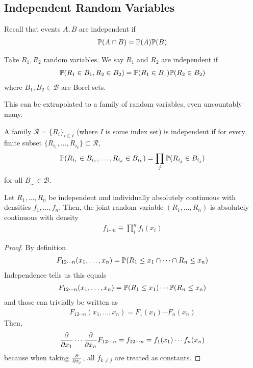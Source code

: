 \subsection{Independent Random Variables}
Recall that events $A,B$ are independent if
\begin{align}
    \mathbb{P}(A \cap B) = \mathbb{P}(A) \mathbb{P}(B)
\end{align}
\begin{definition}
    Take $R_1,R_2$ random variables. We say $R_1$ and $R_2$ are independent if
    \begin{align}
        \mathbb{P}(R_1 \in B_1, R_2 \in B_2) = \mathbb{P}(R_1 \in B_1) \mathbb{P}(R_2 \in B_2)
    \end{align}
    where $B_1, B_2 \in \mathcal{B}$ are Borel sets.
\end{definition}
\noindent This can be extrapolated to a family of random variables, even uncountably many.
\begin{definition}
    A family $\mathcal{R} = \{ R_i \}_{i \in I}$ (where $I$ is some index set) is independent if for every finite subset $\{ R_{i_1}, \ldots, R_{i_k} \} \subset \mathcal{R}$,
    \begin{align}
        \mathbb{P}(R_{i_1} \in B_{i_1}, \ldots, R_{i_k} \in B_{i_k}) = \prod_{j} \mathbb{P}(R_{i_j} \in B_{i_j})
    \end{align}
    for all $B_{\ldots} \in \mathcal{B}$.
\end{definition}

\begin{proposition}
    Let $R_1, \ldots, R_n$ be independent and individually absolutely continuous with densities $f_1, \ldots, f_n$. Then, the joint random variable $(R_1, \ldots, R_n)$ is absolutely continuous with density
    \begin{align}
        f_{1\cdots n} \equiv \prod_i^n f_i(x_i)
    \end{align}
\end{proposition}
\begin{proof}
    By definition
    \begin{align}
        F_{12 \cdots n}(x_1, \ldots, x_n) = \mathbb{P}(R_1 \le x_1 \cap \cdots \cap R_n \le x_n)
    \end{align}
    Independence tells us this equals
    \begin{align}
        F_{12 \cdots n}(x_1, \ldots, x_n) = \mathbb{P}(R_1 \le x_1) \cdots \mathbb{P}(R_n \le x_n)
    \end{align}
    and those can trivially be written as
    \begin{align}
        F_{12 \cdots n}(x_1, \ldots, x_n) = F_1(x_1) \cdots F_n(x_n)
    \end{align}
    Then,
    \begin{align}
        \pdv{x_1}\cdots\pdv{x_n} F_{12 \cdots n} = f_{12 \cdots n} = f_1(x_1) \cdots f_n(x_n)
    \end{align}
    because when taking $\pdv{x_j}$, all $f_{k \ne j}$ are treated as constants.
\end{proof}

